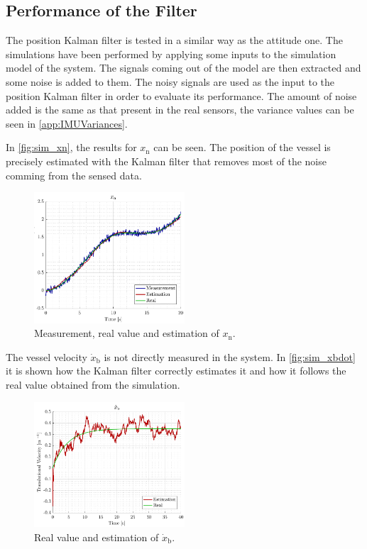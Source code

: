 \subsection{Performance of the Filter}
The position Kalman filter is tested in a similar way as the attitude one. The simulations have been performed by applying some inputs to the simulation model of the system. The signals coming out of the model are then extracted and some noise is added to them. The noisy signals are used as the input to the position Kalman filter in order to evaluate its performance. The amount of noise added is the same as that present in the real sensors, the variance values can be seen in \autoref{app:IMUVariances}.


In \autoref{fig:sim_xn}, the results for $x_\mathrm{n}$ can be seen. The position of the vessel is precisely estimated with the Kalman filter that removes most of the noise comming from the sensed data.
\begin{figure}[H]
    \includegraphics[width=0.5\textwidth]{figures/sim_xn}
    \caption{Measurement, real value and estimation of $x_\mathrm{n}$.}
    \label{fig:sim_xn}
\end{figure}

The vessel velocity $\dot{x}_\mathrm{b}$ is not directly measured in the system. In \autoref{fig:sim_xbdot} it is shown how the Kalman filter correctly estimates it and how it follows the real value obtained from the simulation.
\begin{figure}[H]
    \includegraphics[width=0.5\textwidth]{figures/sim_xbdot}
    \caption{Real value and estimation of $\dot{x}_\mathrm{b}$.}
    \label{fig:sim_xbdot}
\end{figure}

